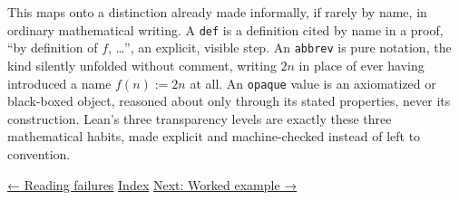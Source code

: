 \begin{mathreading}

This maps onto a distinction already made informally, if rarely by name, in ordinary mathematical writing. A \texttt{def} is a definition cited by name in a proof, ``by definition of \(f\), \ldots{}'', an explicit, visible step. An \texttt{abbrev} is pure notation, the kind silently unfolded without comment, writing \(2n\) in place of ever having introduced a name \(f(n) := 2n\) at all. An \texttt{opaque} value is an axiomatized or black-boxed object, reasoned about only through its stated properties, never its construction. Lean's three transparency levels are exactly these three mathematical habits, made explicit and machine-checked instead of left to convention.

\end{mathreading}

\hyperref[sec:04-tactics:03-reading-failures:1]{← Reading failures} \textbar{} \hyperref[sec:04-tactics:00-index:1]{Index} \textbar{} \hyperref[sec:04-tactics:05-worked-example:1]{Next: Worked example →}
